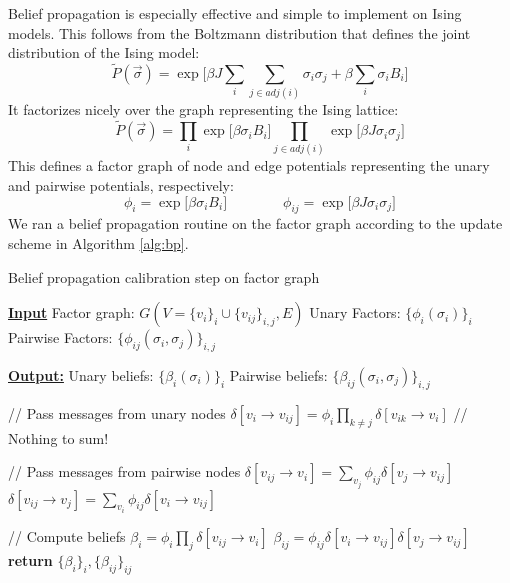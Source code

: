 \documentclass{article}
\begin{document}
Belief propagation is especially effective and simple to implement on Ising 
models. 
This follows from the Boltzmann distribution that defines the joint distribution 
of the Ising model:
\begin{equation}\label{isingJoint}
    \tilde{P}(\vec{\sigma}) = \exp \Bigr [\beta J\sum_i \sum_{j \in adj(i)} \sigma_i \sigma_j + \beta \sum_i \sigma_i B_i \Bigr ]
\end{equation}
It factorizes nicely over the graph representing the Ising lattice:
\begin{equation}\label{gibbsFactorization}
    \tilde{P}(\vec{\sigma}) = \prod_i \exp \Bigr [\beta \sigma_i B_i \Bigr ] \prod_{j \in adj(i)} \exp \Bigr [ \beta J \sigma_i \sigma_j \Bigr ]
\end{equation}
This defines a factor graph of node and edge potentials representing the unary 
and pairwise potentials, respectively:
\[
    \phi_i = \exp \Bigr [\beta \sigma_i B_i \Bigr ]
    \qquad \qquad
    \phi_{ij} = \exp \Bigr [ \beta J \sigma_i \sigma_j \Bigr ]
\]
We ran a belief propagation routine on the factor graph according to the update 
scheme in Algorithm \ref{alg:bp}. 

\begin{algorithm}
    \caption{Belief propagation calibration step on factor graph}
    \begin{algorithmic}[1]
        \Statex \underline{\textbf{Input}}
        \Statex \quad Factor graph: $G(V = \{v_i\}_i \cup \{v_{ij}\}_{i, j}, E)$
        \Statex \quad Unary Factors: $\{\phi_i(\sigma_i)\}_i$
        \Statex \quad Pairwise Factors: $\{\phi_{ij}(\sigma_i, \sigma_j)\}_{i, j}$

        \Statex \underline{\textbf{Output:}}
        \Statex \quad Unary beliefs: $\{\beta_i(\sigma_i)\}_i$
        \Statex \quad Pairwise beliefs: $\{\beta_{ij}(\sigma_i, \sigma_j)\}_{i, j}$
        
        \Statex // Pass messages from unary nodes
        \State $\delta[v_i \rightarrow v_{ij}] = \phi_i \prod_{k \neq j} \delta[v_{ik} \rightarrow v_i]$ \quad // Nothing to sum!
        \EndFor
        \EndFor

        \Statex // Pass messages from pairwise nodes
        \State $\delta[v_{ij} \rightarrow v_i] = \sum_{v_j} \phi_{ij} \delta[v_j \rightarrow v_{ij}]$
        \State $\delta[v_{ij} \rightarrow v_j] = \sum_{v_i} \phi_{ij} \delta[v_i \rightarrow v_{ij}]$
        \EndFor
        \EndFor

        \Statex // Compute beliefs
        \State $\beta_i = \phi_i \prod_{j} \delta[v_{ij} \rightarrow v_i]$
        \EndFor
        \State $\beta_{ij} = \phi_{ij} \delta[v_i \rightarrow v_{ij}] \delta[v_j \rightarrow v_{ij}]$
        \EndFor
        \State \textbf{return } $\{\beta_i\}_i, \{\beta_{ij}\}_{ij}$
    \end{algorithmic}
    \label{alg:bp}
\end{algorithm}
\end{document}
